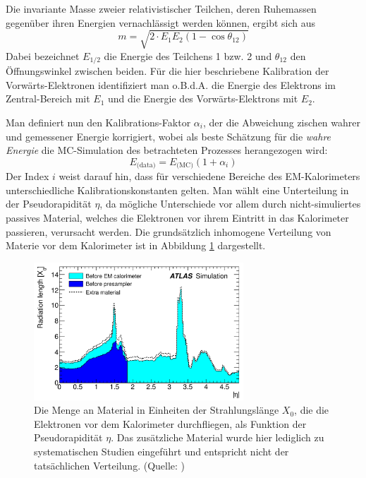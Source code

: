 Die invariante Masse zweier relativistischer Teilchen, deren Ruhemassen
gegenüber ihren Energien vernachlässigt werden können, ergibt sich aus
\begin{equation}
    \label{invariant_mass:basic}
    m = \sqrt{ 2 \cdot E_1 E_2 (1-\cos\theta_{12}) }
\end{equation}
Dabei bezeichnet $E_{1/2}$ die Energie des Teilchens 1 bzw. 2 und $\theta_{12}$
den Öffnungswinkel zwischen beiden. Für die hier beschriebene Kalibration der
Vorwärts-Elektronen identifiziert man o.B.d.A. die Energie des Elektrons im
Zentral-Bereich mit $E_1$ und die Energie des Vorwärts-Elektrons mit $E_2$.

Man definiert nun den Kalibrations-Faktor $\alpha_i$, der die Abweichung
zischen wahrer und gemessener Energie korrigiert, wobei als beste Schätzung für
die \textit{wahre Energie} die \acs{MC}-Simulation des betrachteten Prozesses
herangezogen wird:
\begin{equation}
    \label{definition:energy_scale}
    E_\text{(data)} = E_\text{(MC)} (1+\alpha_i)
\end{equation}
Der Index $i$ weist darauf hin, dass für verschiedene Bereiche des
EM-Kalorimeters unterschiedliche Kalibrationskonstanten gelten. Man wählt eine
Unterteilung in der Pseudorapidität $\eta$, da mögliche Unterschiede vor allem
durch nicht-simuliertes passives Material, welches die Elektronen vor ihrem 
Eintritt in das Kalorimeter passieren, verursacht werden. Die grundsätzlich
inhomogene Verteilung von Materie vor dem Kalorimeter ist in Abbildung
\ref{fig:extra_material} dargestellt.

\begin{figure}
    \centering
    \includegraphics[width=0.7\textwidth]{img/extra_material}
    \caption[Material vor dem EM-Kalorimeter]
        {Die Menge an Material in Einheiten der Strahlungslänge $X_0$, die die
        Elektronen vor dem Kalorimeter durchfliegen, als Funktion der 
        Pseudorapidität $\eta$. Das zusätzliche Material wurde hier lediglich 
        zu systematischen Studien eingeführt und entspricht nicht der 
        tatsächlichen Verteilung. (Quelle: \cite{Aad:2011mk})}
    \label{fig:extra_material}
\end{figure}

